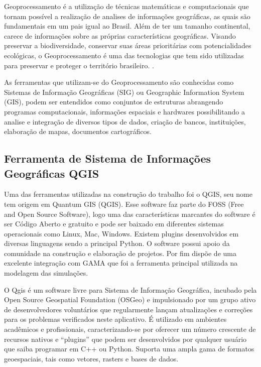 Geoprocessamento é a utilização de técnicas matemáticas e computacionais que tornam possível a realização de analises de informações geográficas, as quais são fundamentais em um pais igual ao Brasil. Além de ter um tamanho continental, carece de informações sobre as próprias características geográficas. Visando preservar a biodiversidade, conservar suas áreas prioritárias com potencialidades ecológicas, o Geoprocessamento é uma das tecnologias que tem sido utilizadas para preservar e proteger o território brasileiro.\cite{ximenes_modelagem_2008} \cite{georef:online}. 

As ferramentas que utilizam-se do Geoprocessamento são conhecidas como Sistemas de Informação Geográficas (SIG) ou Geographic Information System (GIS), podem ser entendidos como conjuntos de estruturas abrangendo programas computacionais, informações espaciais e hardwares possibilitando a analise e integração de diversos tipos de dados, criação de bancos, instituições, elaboração de mapas, documentos cartográficos\cite{Burrough:online}.


\subsection{Ferramenta de Sistema de Informações Geográficas QGIS}

Uma das ferramentas utilizadas na construção do trabalho foi o QGIS, seu nome tem origem em Quantum GIS (QGIS). Esse software faz parte do FOSS (Free and Open Source Software), logo uma das características marcantes do software é ser Código Aberto e gratuito\cite{Qgis:online} e pode ser baixado em diferentes sistemas operacionais como Linux, Mac, Windows. Existem plugins desenvolvidos em diversas linguagens 
sendo a principal Python. O software possui apoio da comunidade na construção e elaboração de projetos. Por fim dispõe de uma excelente integração com GAMA que foi a ferramenta principal utilizada na modelagem das simulações. 

O Qgis é um software livre para Sistema de Informação Geográfica, incubado pela Open Source Geospatial Foundation (OSGeo) e impulsionado por um grupo ativo de desenvolvedores voluntários que regularmente lançam atualizações e correções para os problemas verificados neste aplicativo. É utilizado em ambientes acadêmicos e profissionais, caracterizando-se por oferecer um número crescente de recursos nativos e “plugins” que podem ser desenvolvidos por qualquer usuário que saiba programar em C++ ou Python. Suporta uma ampla gama de formatos geoespaciais, tais como vetores, rasters e bases de dados. \cite{bruno2017aplicabilidade}

